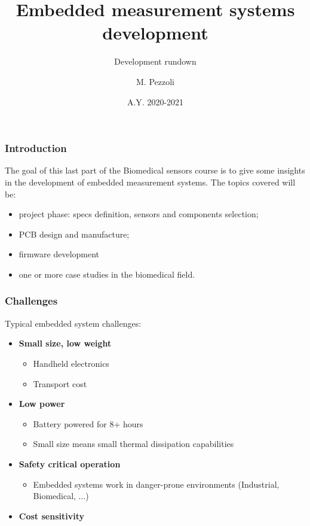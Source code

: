 \documentclass[11pt,xcolor=table,aspectratio=169]{beamer}
\title[Biomedical sensors 20/21]{Embedded measurement systems development}
\subtitle{Development rundown}
\author{M. Pezzoli}
\date{A.Y. 2020-2021}
\begin{document}
	
	\maketitle
	\begin{frame}
		\frametitle{Introduction}
		The goal of this last part of the Biomedical sensors course is to give some insights in the development of embedded measurement systems. The topics covered will be:
		\begin{itemize}
			\item project phase: specs definition, sensors and components selection;
			\item PCB design and manufacture;
			\item firmware development
			\item one or more case studies in the biomedical field.
		\end{itemize}
	\end{frame}

	\begin{frame}
		\frametitle{Challenges}
		Typical embedded system challenges:
		\begin{itemize}
			\item \textbf{Small size, low weight}\begin{itemize}
				\item Handheld electronics
				\item Transport cost
			\end{itemize}
			\item \textbf{Low power} \begin{itemize}
				\item Battery powered for 8+ hours
				\item Small size means small thermal dissipation capabilities
			\end{itemize}
			\item \textbf{Safety critical operation}\begin{itemize}
				\item Embedded systems work in danger-prone environments (Industrial, Biomedical, ...)
			\end{itemize}
			\item \textbf{Cost sensitivity}
		\end{itemize}
	\end{frame}
\end{document}
